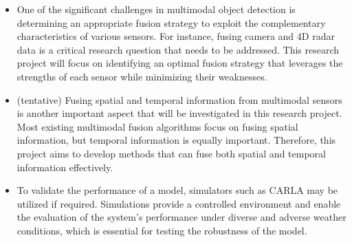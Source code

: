 \documentclass[rnd]{mas_proposal}
\begin{document}
\begin{itemize}
      \item One of the significant challenges in multimodal object detection is determining an appropriate fusion strategy to exploit the complementary characteristics of various sensors. For instance, fusing camera and 4D radar data is a critical research question that needs to be addressed. This research project will focus on identifying an optimal fusion strategy that leverages the strengths of each sensor while minimizing their weaknesses.

      \item (tentative) Fusing spatial and temporal information from multimodal sensors is another important aspect that will be investigated in this research project. Most existing multimodal fusion algorithms focus on fusing spatial information, but temporal information is equally important. Therefore, this project aims to develop methods that can fuse both spatial and temporal information effectively.

      \item To validate the performance of a model, simulators such as CARLA may be utilized if required. Simulations provide a controlled environment and enable the evaluation of the system's performance under diverse and adverse weather conditions, which is essential for testing the robustness of the model.


\end{itemize}
\end{document}
